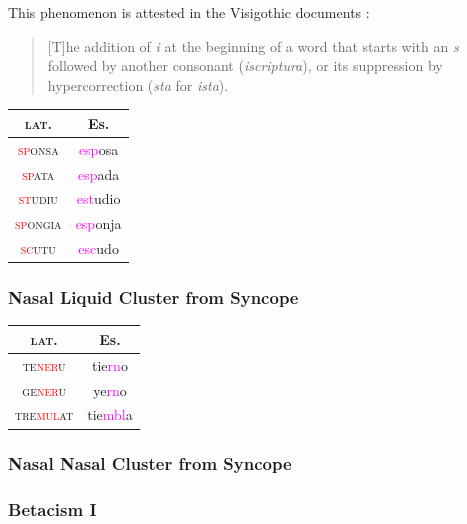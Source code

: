 \documentclass{report}[12pt]
\begin{document}
This phenomenon is attested in the Visigothic documents \parencite[p.~159]{latin_palaeography}:
\begin{quote}
  [T]he addition of \emph{i} at the beginning of a word that starts with an \emph{s} followed by another consonant (\emph{iscriptura}), or its suppression by hypercorrection (\emph{sta} for \emph{ista}).
\end{quote}

\begin{tabular}{c c}
  \textsc{lat.} & Es. \\
  \hline
  \textsc{\textcolor{red}{sp}onsa} & \textcolor{magenta}{esp}osa \\
  \textsc{\textcolor{red}{sp}ata} & \textcolor{magenta}{esp}ada \\
  \textsc{\textcolor{red}{st}udiu} & \textcolor{magenta}{est}udio \\
  \textsc{\textcolor{red}{sp}ongia} & \textcolor{magenta}{esp}onja \\
  \textsc{\textcolor{red}{sc}utu} & \textcolor{magenta}{esc}udo \\
\end{tabular}

\subsubsection*{Nasal Liquid Cluster from Syncope}

\begin{tabular}{c c}
  \textsc{lat.} & Es. \\
  \hline
  \textsc{te\textcolor{red}{ner}u} & tie\textcolor{magenta}{rn}o \\
  \textsc{ge\textcolor{red}{ner}u} & ye\textcolor{magenta}{rn}o \\
  \textsc{tre\textcolor{red}{mul}at} & tie\textcolor{magenta}{mbl}a \\
\end{tabular}

\subsubsection*{Nasal Nasal Cluster from Syncope}

\subsubsection*{Betacism I}

\begin{tcolorbox}

\end{tcolorbox}
\end{document}
